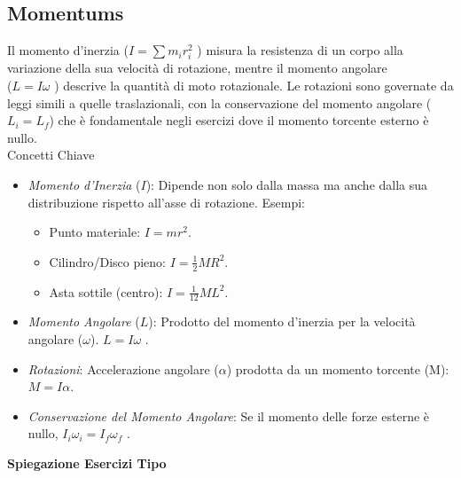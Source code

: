 \documentclass[a4paper,10pt]{article}
\begin{document}
\subsection{Momentums}
Il momento d'inerzia (\(I = \sum m_ir_i^2\) ) misura la resistenza di un corpo alla variazione della sua velocità di rotazione, mentre il momento angolare\\(\(L = I\omega\) ) descrive la quantità di moto rotazionale. Le rotazioni sono governate da leggi simili a quelle traslazionali, con la conservazione del momento angolare (\(L_i = L_f \)) che è fondamentale negli esercizi dove il momento torcente esterno è nullo.\\
Concetti Chiave
\begin{itemize}
    \item \emph{Momento d'Inerzia} (\(I\)): Dipende non solo dalla massa ma anche dalla sua distribuzione rispetto all'asse di rotazione.
Esempi:
\begin{itemize}
        \item Punto materiale: \(I = mr^2\).
        \item Cilindro/Disco pieno: \(I = \frac{1}{2}MR^2\).
        \item Asta sottile (centro): \(I = \frac{1}{12}ML^2\).
\end{itemize}
    \item \emph{Momento Angolare} (\(L\)): Prodotto del momento d'inerzia per la velocità angolare (\(\omega\)). \(L = I\omega\) .
    \item \emph{Rotazioni}: Accelerazione angolare (\(\alpha\)) prodotta da un momento torcente (M): \(M = I\alpha\).
    \item \emph{Conservazione del Momento Angolare}: Se il momento delle forze esterne è nullo,              \(I_i\omega_i = I_f\omega_f\) .
\end{itemize}
\textbf{Spiegazione Esercizi Tipo}
\end{document}
